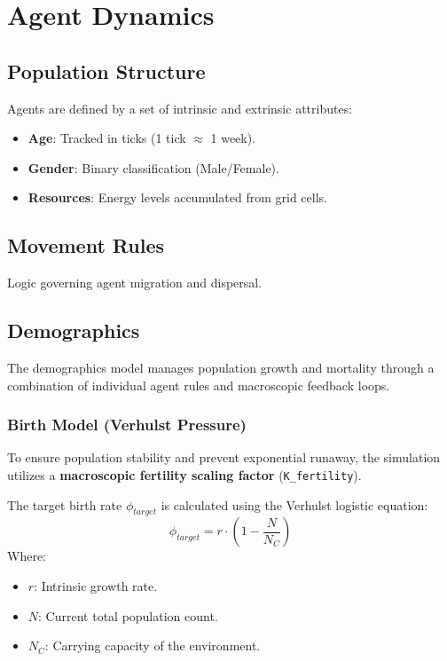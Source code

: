 \documentclass[11pt,a4paper]{report}
\begin{document}
\chapter{Agent Dynamics}
\section{Population Structure}
Agents are defined by a set of intrinsic and extrinsic attributes:
\begin{itemize}
    \item \textbf{Age}: Tracked in ticks (1 tick $\approx$ 1 week).
    \item \textbf{Gender}: Binary classification (Male/Female).
    \item \textbf{Resources}: Energy levels accumulated from grid cells.
\end{itemize}

\section{Movement Rules}
Logic governing agent migration and dispersal.

\section{Demographics}
The demographics model manages population growth and mortality through a combination of individual agent rules and macroscopic feedback loops.

\subsection{Birth Model (Verhulst Pressure)}
To ensure population stability and prevent exponential runaway, the simulation utilizes a \textbf{macroscopic fertility scaling factor} (\texttt{K\_fertility}). 

The target birth rate $\phi_{target}$ is calculated using the Verhulst logistic equation:
\begin{equation}
    \phi_{target} = r \cdot \left( 1 - \frac{N}{N_C} \right)
\end{equation}
Where:
\begin{itemize}
    \item $r$: Intrinsic growth rate.
    \item $N$: Current total population count.
    \item $N_C$: Carrying capacity of the environment.
\end{itemize}
\end{document}
